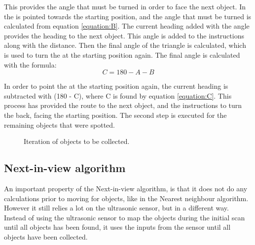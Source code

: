 This provides the angle that must be turned in order to face the next object. In  the \projname{} is pointed towards the starting position, and the angle that must be turned is calculated from equation \ref{equation:B}. The current heading added with the angle provides the heading to the next object. This angle is added to the instructions along with the distance. Then the final angle of the triangle is calculated, which is used to turn the \projname{} at the starting position again. The final angle is calculated with the formula:
\begin{equation}
C = 180 - A - B \label{equation:C}
\end{equation}

In order to point the \projname{} at the starting position again, the current heading is subtracted with (180 - C), where C is found by equation \ref{equation:C}. This process has provided the route to the next object, and the instructions to turn the \projname{} back, facing the starting position. The second step is executed for the remaining objects that were spotted. 

\begin{figure}[H]
     \caption{\label{fig:object_navigation_iteration} Iteration of objects to be collected.}
\end{figure}


\subsection{Next-in-view algorithm} \label{sec:niv-algorithm}
An important property of the Next-in-view algorithm, is that it does not do any calculations prior to moving for objects, like in the Nearest neighbour algorithm. However it still relies a lot on the ultrasonic sensor, but in a different way. Instead of using the ultrasonic sensor to map the objects during the initial scan until all objects has been found, it uses the inputs from the sensor until all objects have been collected. 

